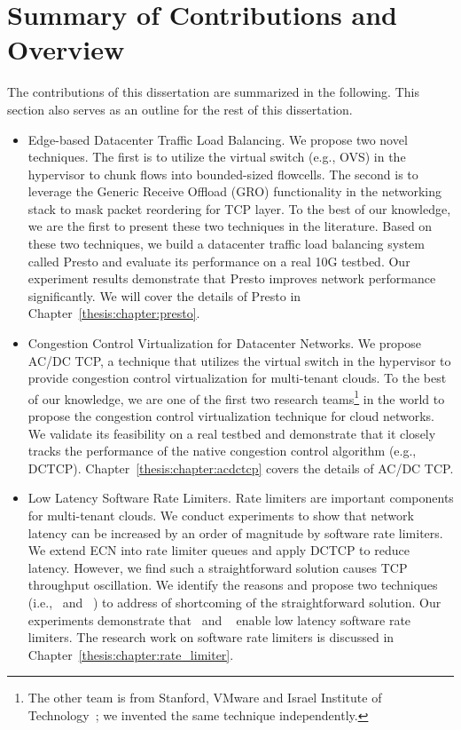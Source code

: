 \section{Summary of Contributions and Overview}

The contributions of this dissertation are summarized in the following. 
This section also serves as an outline for the rest of this dissertation.

\begin{itemize}
\item Edge-based Datacenter Traffic Load Balancing. We propose two novel techniques. 
The first is to utilize the virtual switch (e.g., OVS) in the hypervisor to chunk flows into bounded-sized flowcells. 
The second is to leverage the Generic Receive Offload (GRO) functionality in the networking stack to 
mask packet reordering for TCP layer. To the best of our knowledge, we are the first to 
present these two techniques in the literature. Based on these two techniques, we build a datacenter 
traffic load balancing system called Presto and evaluate its performance on a real 10G testbed. 
Our experiment results demonstrate that Presto improves network performance significantly. 
We will cover the details of Presto in Chapter~\ref{thesis:chapter:presto}.
 
\item Congestion Control Virtualization for Datacenter Networks. 
We propose AC/DC TCP, a technique that utilizes the virtual switch in the hypervisor 
to provide congestion control virtualization for multi-tenant clouds. 
To the best of our knowledge, we are one of the first two research teams\footnote{The other team is from 
Stanford, VMware and Israel Institute of Technology~\cite{vcc}; we invented the same technique independently.} in the world to 
propose the congestion control virtualization technique for cloud networks. 
We validate its feasibility on a real testbed and demonstrate that it closely tracks the performance of
the native congestion control algorithm (e.g., DCTCP). Chapter~\ref{thesis:chapter:acdctcp} covers the details of AC/DC TCP.
 
\item Low Latency Software Rate Limiters. Rate limiters are important 
components for multi-tenant clouds. We conduct experiments to show that network latency 
can be increased by an order of magnitude by software rate limiters. We extend ECN into rate 
limiter queues and apply DCTCP to reduce latency. However, we find such a straightforward 
solution causes TCP throughput oscillation. We identify the reasons and propose 
two techniques (i.e.,~\dem{} and ~\spring{}) to address of shortcoming of the 
straightforward solution. Our experiments demonstrate that~\dem{} and ~\spring{} enable 
low latency software rate limiters. The research work on software rate limiters is 
discussed in Chapter~\ref{thesis:chapter:rate_limiter}.


\end{itemize}
